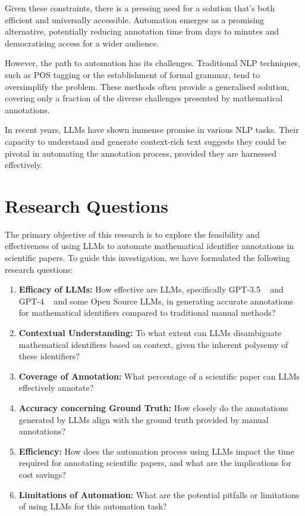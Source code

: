 Given these constraints, there is a pressing need for a solution that's both efficient and universally accessible. Automation emerges as a promising alternative, potentially reducing annotation time from days to minutes and democratising access for a wider audience.

However, the path to automation has its challenges. Traditional \ac{NLP} techniques, such as \ac{POS} tagging or the establishment of formal grammar, tend to oversimplify the problem. These methods often provide a generalised solution, covering only a fraction of the diverse challenges presented by mathematical annotations. 

In recent years, LLMs have shown immense promise in various NLP tasks. Their capacity to understand and generate context-rich text suggests they could be pivotal in automating the annotation process, provided they are harnessed effectively.

\section{Research Questions}

The primary objective of this research is to explore the feasibility and effectiveness of using LLMs to automate mathematical identifier annotations in scientific papers. To guide this investigation, we have formulated the following research questions:

\begin{enumerate}
    \item \textbf{Efficacy of LLMs:} How effective are LLMs, specifically GPT-3.5 ~\citep{openai2023} and GPT-4 ~\citep{2303.08774} and some Open Source LLMs, in generating accurate annotations for mathematical identifiers compared to traditional manual methods?
    
    \item \textbf{Contextual Understanding:} To what extent can LLMs disambiguate mathematical identifiers based on context, given the inherent polysemy of these identifiers?
    
    \item \textbf{Coverage of Annotation:} What percentage of a scientific paper can LLMs effectively annotate?
    
    \item \textbf{Accuracy concerning Ground Truth:} How closely do the annotations generated by LLMs align with the ground truth provided by manual annotations?
    
    \item \textbf{Efficiency:} How does the automation process using LLMs impact the time required for annotating scientific papers, and what are the implications for cost savings?
    
    \item \textbf{Limitations of Automation:} What are the potential pitfalls or limitations of using LLMs for this automation task?
\end{enumerate}

